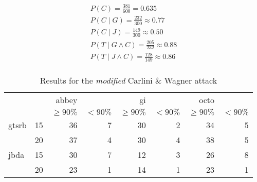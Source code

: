 \begin{align}
P(C) = \frac{381}{600} = 0.635\\[1ex]
P(C \mid G) = \frac{232}{300} \approx 0.77\\[1ex]
P(C \mid J) = \frac{149}{300} \approx 0.50\\[1ex]
P(T \mid G \wedge C) = \frac{205}{232} \approx 0.88\\[1ex]
P(T \mid J \wedge C) = \frac{128}{149} \approx 0.86\\[1ex]
\end{align}

\begin{table}
\begin{tabular}{l l | r r | r r | r r}
& & abbey & & gi & & octo & \\[1ex]
& & \footnotesize$\geq90\%$ & \footnotesize$<90\%$ & \footnotesize$\geq90\%$ & \footnotesize$<90\%$ & \footnotesize$\geq90\%$ & \footnotesize$<90\%$ \\[1ex]
\hline
gtsrb & 15 & 36 & 7 & 30 & 2 & 34 & 5
\\[1ex]
 & 20 & 37 & 4 & 30 & 4 & 38 & 5\\[1ex]
\hline
jbda & 15 & 30 & 7 & 12 & 3 & 26 & 8
\\[1ex]
  & 20 & 23 & 1 & 14 & 1 & 23 & 1
\end{tabular}
\caption{Results for the \textit{modified} Carlini \& Wagner attack}
\label{tab:robust_result}
\end{table}